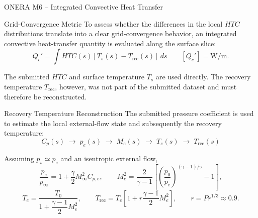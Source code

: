 \begin{frame}[shrink=15]{\small ONERA M6 -- Integrated Convective Heat Transfer}
\scriptsize

\centering

\begin{minipage}{0.90\textwidth}
\begin{block}{\scriptsize Grid-Convergence Metric}
To assess whether the differences in the local $HTC$ distributions translate
into a clear grid-convergence behavior, an integrated convective heat-transfer
quantity is evaluated along the surface slice:
\[
\boxed{
Q_c'
=
\int
HTC(s)
\left[
T_s(s)-T_{\mathrm{rec}}(s)
\right]\,ds
}
\qquad
[Q_c'] = \mathrm{W/m}.
\]

The submitted $HTC$ and surface temperature $T_s$ are used directly.
The recovery temperature $T_{\mathrm{rec}}$, however, was not part of the
submitted dataset and must therefore be reconstructed.
\end{block}
\end{minipage}

\vspace{0.15cm}

\begin{minipage}{0.90\textwidth}
\begin{block}{\scriptsize Recovery Temperature Reconstruction}
The submitted pressure coefficient is used to estimate the local external-flow
state and subsequently the recovery temperature:
\[
\boxed{
C_p(s)
\;\longrightarrow\;
p_e(s)
\;\longrightarrow\;
M_e(s)
\;\longrightarrow\;
T_e(s)
\;\longrightarrow\;
T_{\mathrm{rec}}(s)
}
\]

Assuming $p_s \simeq p_e$ and an isentropic external flow,
\[
\frac{p_e}{p_\infty}
=
1+\frac{\gamma}{2}M_\infty^2 C_{p,e},
\qquad
M_e^2
=
\frac{2}{\gamma-1}
\left[
\left(\frac{p_0}{p_e}\right)^{(\gamma-1)/\gamma}-1
\right],
\]
\[
T_e
=
\frac{T_0}
{1+\dfrac{\gamma-1}{2}M_e^2},
\qquad
T_{\mathrm{rec}}
=
T_e
\left[
1+r\frac{\gamma-1}{2}M_e^2
\right],
\qquad
r=Pr^{1/3}\approx0.9.
\]

\end{block}
\end{minipage}

\end{frame}


